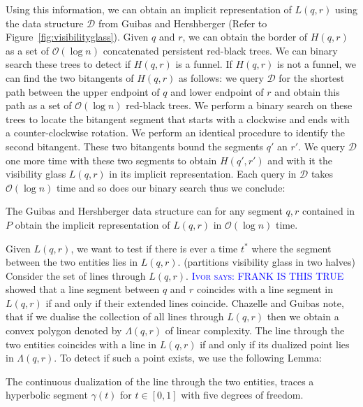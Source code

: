\documentclass[a4paper, UKenglish]{lipics-v2018}
\newcommand{\myremark}[4]{\textcolor{blue}{\textsc{#1 #2:}} \textcolor{#4}{\textsf{#3}}}
\newcommand{\ivor}[2][says]{\myremark{Ivor}{#1}{#2}{Blue}}
\begin{document}
Using this information, we can obtain an implicit representation of $L(q,r)$ using the data structure $\mathcal{D}$ from Guibas and Hershberger (Refer to Figure~\ref{fig:visibilityglass}). Given $q$ and $r$, we can obtain the border of $H(q,r)$ as a set of $\mathcal{O}(\log n)$ concatenated persistent red-black trees. We can binary search these trees to detect if $H(q,r)$ is a funnel. If $H(q,r)$ is not a funnel, we can find the two bitangents of $H(q,r)$ as follows: we query $\mathcal{D}$ for the shortest path between the upper endpoint of $q$ and lower endpoint of $r$ and obtain this path as a set of $\mathcal{O}(\log n)$ red-black trees. We perform a binary search on these trees to locate the bitangent segment that starts with a clockwise and ends with a counter-clockwise rotation. We perform an identical procedure to identify the second bitangent.
These two bitangents bound the segments $q'$ an $r'$. We query $\mathcal{D}$ one more time with these two segments to obtain $H(q', r')$ and with it the visibility glass $L(q,r)$ in its implicit representation. Each query in $\mathcal{D}$ takes $\mathcal{O}(\log n)$ time and so does our binary search thus we conclude:

\begin{lemma}
\label{lemma:visibilityquery}
  The Guibas and Hershberger data structure can for any segment $q,r$ contained in $P$ obtain the implicit representation of $L(q,r)$ in $\mathcal{O}(\log n)$ time.
\end{lemma}

 
Given $L(q,r)$, we want to test if there is ever a time $t^*$ where the segment between the two entities lies in $L(q,r)$. (partitions visibility glass in two halves) Consider the set of lines through $L(q,r)$. \ivor{FRANK IS THIS TRUE} showed that a line segment between $q$ and $r$ coincides with a line segment in $L(q,r)$ if and only if their extended lines coincide. Chazelle and Guibas \cite{Chazelle1989} note, that if we dualise the collection of all lines through $L(q,r)$ then we obtain a convex polygon denoted by $\Lambda(q,r)$ of linear complexity. The line through the two entities coincides with a line in $L(q,r)$ if and only if its dualized point lies in $\Lambda(q,r)$. To detect if such a point exists, we use the following Lemma:

\begin{lemma}
\label{lemma:hyperbola}
  The continuous dualization of the line through the two entities, traces a hyperbolic segment $\gamma(t)$ for $t \in [0,1]$ with five degrees of freedom.
\end{lemma}
\end{document}
